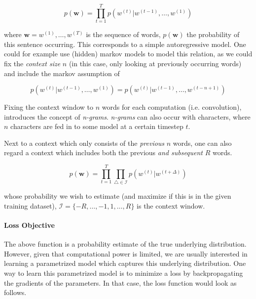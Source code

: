 \documentclass[a4paper,12pt,twoside,openright]{report}
\begin{document}
\begin{equation}
p(\mathbf{w}) = \prod_{t=1}^T p\left( w^{(t)} | w^{(t -1)}, \ldots, w^{(1)} \right)
\end{equation}{\label{eq:naive_sequential_probability}}


where $\mathbf{w} = w^{(1)}, \dots, w^{(T)} $ is the sequence of words, $p(\mathbf{w})$ the probability of this sentence occurring.
This corresponds to a simple autoregressive model.
One could for example use (hidden) markov models to model this relation, as we could fix the \textit{context size} $n$ (in this case, only looking at previously occurring words) and include the markov assumption of

\begin{equation}
p\left( w^{(t)} | w^{(t -1)}, \ldots, w^{(1)} \right) = p\left( w^{(t)} | w^{(t -1)}, \ldots, w^{(t - n + 1)} \right)
\end{equation}{\label{eq:naive_sequential_probability_markovian}}

Fixing the context window to $n$ words for each computation (i.e. convolution), introduces the concept of \textit{n-grams}. 
\textit{n-grams} can also occur with characters, where $n$ characters are fed in to some model at a certain timestep $t$.

Next to a context which only consists of the \textit{previous} $n$ words, one can also regard a context which includes both the previous \textit{and subsequent} $R$ words. 

\begin{equation}
p(\mathbf{w})=\prod_{t=1}^{T} \prod_{\triangle \in \mathcal{I} } p\left( w^{(t)} | w^{(t +\Delta)}\right)
\end{equation}{\label{eq:naive_sequential_probability}}

whose probability we wish to estimate (and maximize if this is in the given training dataset), $\mathcal{I}=\{-R, \ldots,-1,1, \ldots, R\}$ is the context window. 

\paragraph{Loss Objective} The above function is a probability estimate of the true underlying distribution.
However, given that computational power is limited, we are usually interested in learning a parametrized model which captures this underlying distribution.
One way to learn this parametrized model is to minimize a loss by backpropagating the gradients of the parameters.
In that case, the loss function would look as follows.
\end{document}
